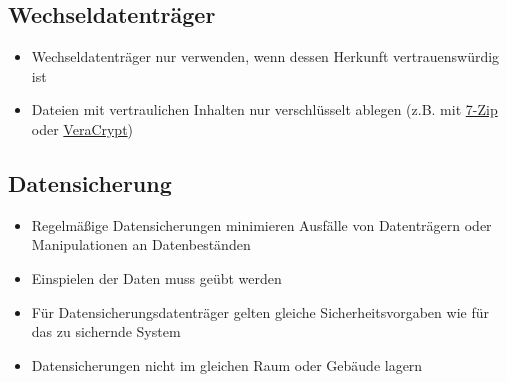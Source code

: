 

\subsection{Wechseldatenträger}

\begin{frame}
\begin{itemize}
	\item Wechseldatenträger nur verwenden, wenn dessen Herkunft vertrauenswürdig ist
	\item Dateien mit vertraulichen Inhalten nur verschlüsselt ablegen (z.B. mit \href{http://www.7-zip.de/}{7-Zip} oder \href{https://www.veracrypt.fr}{VeraCrypt})
\end{itemize}
\end{frame}

\subsection{Datensicherung}

\begin{frame}
\begin{itemize}
	\item Regelmäßige Datensicherungen minimieren Ausfälle von Datenträgern oder Manipulationen an Datenbeständen
	\item Einspielen der Daten muss geübt werden
	\item Für Datensicherungsdatenträger gelten gleiche Sicherheitsvorgaben wie für das zu sichernde System
	\item Datensicherungen nicht im gleichen Raum oder Gebäude lagern
\end{itemize}
\end{frame}

